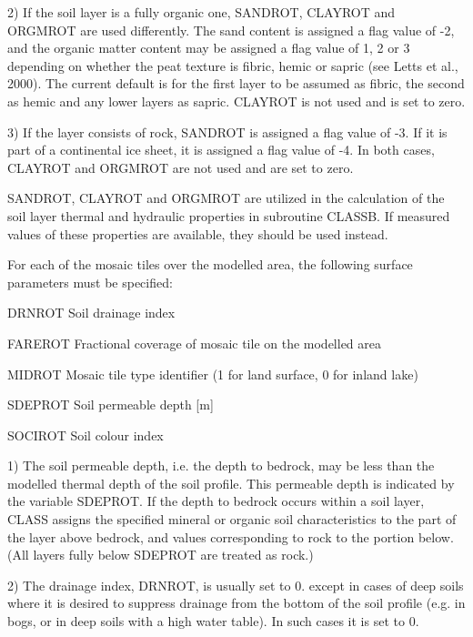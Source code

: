 2) If the soil layer is a fully organic one, S\+A\+N\+D\+R\+O\+T, C\+L\+A\+Y\+R\+O\+T and O\+R\+G\+M\+R\+O\+T are used differently. The sand content is assigned a flag value of -\/2, and the organic matter content may be assigned a flag value of 1, 2 or 3 depending on whether the peat texture is fibric, hemic or sapric (see Letts et al., 2000). The current default is for the first layer to be assumed as fibric, the second as hemic and any lower layers as sapric. C\+L\+A\+Y\+R\+O\+T is not used and is set to zero.

3) If the layer consists of rock, S\+A\+N\+D\+R\+O\+T is assigned a flag value of -\/3. If it is part of a continental ice sheet, it is assigned a flag value of -\/4. In both cases, C\+L\+A\+Y\+R\+O\+T and O\+R\+G\+M\+R\+O\+T are not used and are set to zero.

S\+A\+N\+D\+R\+O\+T, C\+L\+A\+Y\+R\+O\+T and O\+R\+G\+M\+R\+O\+T are utilized in the calculation of the soil layer thermal and hydraulic properties in subroutine C\+L\+A\+S\+S\+B. If measured values of these properties are available, they should be used instead.

For each of the mosaic tiles over the modelled area, the following surface parameters must be specified\+:


\begin{DoxyItemize}
\item D\+R\+N\+R\+O\+T Soil drainage index
\item F\+A\+R\+E\+R\+O\+T Fractional coverage of mosaic tile on the modelled area
\item M\+I\+D\+R\+O\+T Mosaic tile type identifier (1 for land surface, 0 for inland lake)
\item S\+D\+E\+P\+R\+O\+T Soil permeable depth \mbox{[}m\mbox{]}
\item S\+O\+C\+I\+R\+O\+T Soil colour index
\end{DoxyItemize}

1) The soil permeable depth, i.\+e. the depth to bedrock, may be less than the modelled thermal depth of the soil profile. This permeable depth is indicated by the variable S\+D\+E\+P\+R\+O\+T. If the depth to bedrock occurs within a soil layer, C\+L\+A\+S\+S assigns the specified mineral or organic soil characteristics to the part of the layer above bedrock, and values corresponding to rock to the portion below. (All layers fully below S\+D\+E\+P\+R\+O\+T are treated as rock.)

2) The drainage index, D\+R\+N\+R\+O\+T, is usually set to 0. except in cases of deep soils where it is desired to suppress drainage from the bottom of the soil profile (e.\+g. in bogs, or in deep soils with a high water table). In such cases it is set to 0.

